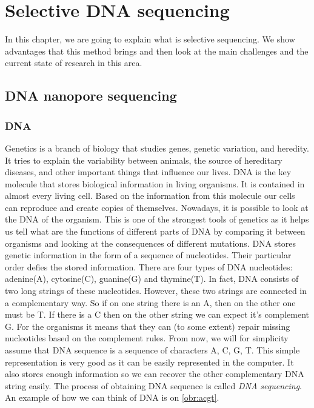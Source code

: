 \chapter{Selective DNA sequencing}

\label{kap:selSeq} %

In this chapter, we are going to explain what is selective sequencing. We
show advantages that this method brings and then look at the main challenges and
the current state of research in this area.

\section{DNA nanopore sequencing}

\subsection{DNA}

Genetics is a branch of biology that studies genes, genetic variation, and heredity.
It tries to explain the variability between animals, the source of hereditary diseases, and
other important things that influence our lives. DNA is the key molecule
that stores biological information in living organisms. It is contained in
almost every living cell. Based on the information from this molecule our cells can reproduce and create copies of
themselves. Nowadays, it is possible to look at the DNA of the organism. This is
one of the strongest tools of genetics as it helps us tell what are the functions
of different parts of DNA by comparing it between organisms and looking at the
consequences of different mutations. DNA stores genetic information in the form of a sequence of
nucleotides. Their particular order defies the stored information. There are four types of DNA nucleotides:
adenine(A), cytosine(C), guanine(G) and thymine(T). In fact, DNA consists of two long
strings of these nucleotides. However, these two strings are connected in a complementary way. So if on one string there is an A, then on the other
one must be T. If there is a C then on the other string we can expect
it's complement G. For the organisms it means that they can (to some extent) repair
missing nucleotides based on the complement rules. From now, we will for simplicity
assume that DNA sequence is a sequence of characters A, C, G, T. This simple representation
is very good as it can be easily represented in the computer. It also stores enough
information so we can recover the other complementary DNA string easily. The process of obtaining DNA
sequence is called \textit{DNA sequencing}.  An example of how we can think of DNA is on \ref{obr:acgt}.

